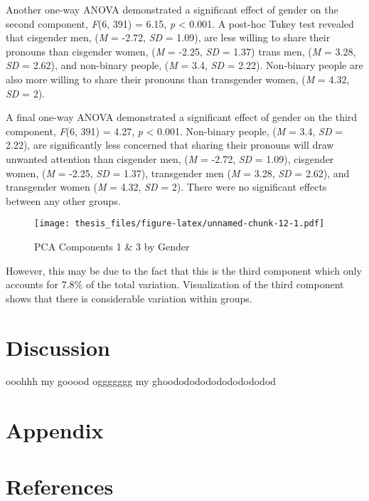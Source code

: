 \documentclass[12pt,twoside]{reedthesis}
\begin{document}
Another one-way ANOVA demonstrated a significant effect of gender on the second component, \emph{F}(6, 391) = 6.15, \emph{p} \textless{} 0.001. A post-hoc Tukey test revealed that cisgender men, (\emph{M} = -2.72, \emph{SD} = 1.09), are less willing to share their pronouns than cisgender women, (\emph{M} = -2.25, \emph{SD} = 1.37) trans men, (\emph{M} = 3.28, \emph{SD} = 2.62), and non-binary people, (\emph{M} = 3.4, \emph{SD} = 2.22). Non-binary people are also more willing to share their pronouns than transgender women, (\emph{M} = 4.32, \emph{SD} = 2).

A final one-way ANOVA demonstrated a significant effect of gender on the third component, \emph{F}(6, 391) = 4.27, \emph{p} \textless{} 0.001. Non-binary people, (\emph{M} = 3.4, \emph{SD} = 2.22), are significantly less concerned that sharing their pronouns will draw unwanted attention than cisgender men, (\emph{M} = -2.72, \emph{SD} = 1.09), cisgender women, (\emph{M} = -2.25, \emph{SD} = 1.37), transgender men (\emph{M} = 3.28, \emph{SD} = 2.62), and transgender women (\emph{M} = 4.32, \emph{SD} = 2). There were no significant effects between any other groups.
\begin{figure}
\centering
\texttt{[image: thesis\_files/figure-latex/unnamed-chunk-12-1.pdf]}
\caption{\label{fig:unnamed-chunk-12}PCA Components 1 \& 3 by Gender}
\end{figure}
However, this may be due to the fact that this is the third component which only accounts for 7.8\% of the total variation. Visualization of the third component shows that there is considerable variation within groups.

\hypertarget{discussion}{%
\chapter{Discussion}\label{discussion}}

ooohhh my gooood oggggggg my ghoodododododododododod

\appendix

\hypertarget{appendix}{%
\chapter*{Appendix}\label{appendix}}

\backmatter

\hypertarget{references}{%
\chapter*{References}\label{references}}
\end{document}
